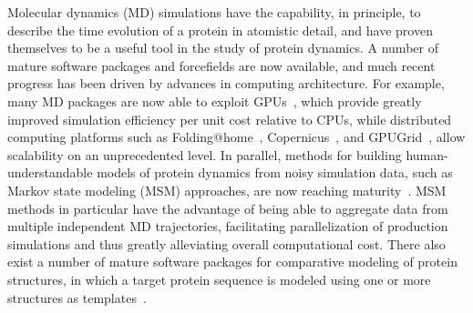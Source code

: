 \documentclass[10pt,letterpaper]{article}
\begin{document}
Molecular dynamics (MD) simulations have the capability, in principle, to describe the time evolution of a protein in atomistic detail, and have proven themselves to be a useful tool in the study of protein dynamics.
A number of mature software packages and forcefields are now available, and much recent progress has been driven by advances in computing architecture.
For example, many MD packages are now able to exploit GPUs~\cite{eastman:jctc:2012:openmm,walker:jctc:2013:amber-gpu}, which provide greatly improved simulation efficiency per unit cost relative to CPUs, while distributed computing platforms such as Folding@home~\cite{shirts-pande:science:2000:fah}, Copernicus~\cite{pronk:2011:copernicus,pronk:2015:copernicus}, and GPUGrid~\cite{buch:2010:gpugrid}, allow scalability on an unprecedented level.
In parallel, methods for building human-understandable models of protein dynamics from noisy simulation data, such as Markov state modeling (MSM) approaches, are now reaching maturity~\cite{pande-beauchamp-bowman:2010:methods:markov-model-review,noe:jcp:2011:msm-review,chodera-noe:curr-opin-struct-biol:2014:msm-review}.
MSM methods in particular have the advantage of being able to aggregate data from multiple independent MD trajectories, facilitating parallelization of production simulations and thus greatly alleviating overall computational cost.
There also exist a number of mature software packages for comparative modeling of protein structures, in which a target protein sequence is modeled using one or more structures as templates~\cite{moult:proteins:2014:casp10,baker:science:2001:structure-prediction-review,baker:structure:2013:rosettacm,yang:nature-methods:2015:i-tasser-suite}.
\end{document}
